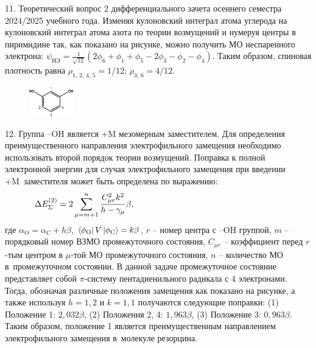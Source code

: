 11. Теоретический вопрос 2 дифференциального зачета осеннего семестра 2024/2025 учебного года. Изменяя кулоновский интеграл атома углерода на кулоновский интеграл атома азота по теории возмущений и нумеруя центры в пиримидине так, как показано на рисунке, можно получить МО неспаренного электрона: $\psi_{\text{НЭ}}=\frac{1}{\sqrt{12}}(2\phi_6+\phi_1+\phi_5-2\phi_3-\phi_2-\phi_4)$. Таким образом, спиновая плотность равна $\rho_{1,\,2,\,4,\,5}=1/12$; $\rho_{3,\,6}=4/12$.\par
\begin{figure} %
    \centering
    \vspace{-2ex}
    \includegraphics[width=19mm]{images/Fig_1_9_12_dec.png}
    \vspace{0mm}
\end{figure}
12. Группа –OH является +M мезомерным заместителем. Для определения преимущественного направления электрофильного замещения необходимо использовать второй порядок теории возмущений. Поправка к полной электронной энергии для случая электрофильного замещения при введении +M~заместителя может быть определена по выражению:
\begin{equation*}
\begin{aligned}
& \Delta E_{\Sigma}^{(2)}=2\sum_{\mu = m+1}^{n} \frac{C_{\mu r}^2 k^2}{h-\gamma_{\mu}} \beta, \hspace{58mm}
\end{aligned}
\end{equation*}
где $\alpha_{\text{O}}=\alpha_{\text{C}}+h\beta$, $\bra{\phi_{\text{O}}} V \ket{\phi_{\text{C}}}=k\beta$, $r$ – номер центра с –OH группой, $m$ – порядковый номер ВЗМО промежуточного состояния, $C_{\mu r}$ – коэффициент перед $r$-тым центром в $\mu$-той МО промежуточного состояния, $n$ – количество МО в~промежуточном состоянии. В данной задаче промежуточное состояние представляет собой $\pi$-систему пентадиенильного радикала с 4 электронами. Тогда, обозначая различные положения замещения как показано на рисунке, а также используя $h=1,2$ и $k=1,1$ получаются следующие поправки: (1) Положение 1: $2,032\beta$, (2) Положения 2, 4: $1,963\beta$, (3) Положение 3: $0,963\beta$. Таким образом, положение 1 является преимущественным направлением электрофильного замещения в~молекуле резорцина.\par
